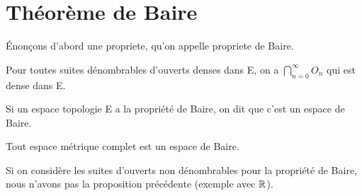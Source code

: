 \section{Théorème de Baire}

Énonçons d'abord une propriete, qu'on appelle propriete de Baire.

\begin{propriete} 
	Pour toutes suites dénombrables d'ouverts denses dans E, on a $\displaystyle
	\bigcap_{n = 0}^{\infty} O_{n}$ qui est dense dans E.
\end{propriete}



\begin{definition} 
	Si un espace topologie E a la propriété de Baire, on dit que c'est un espace
	de Baire.
\end{definition}

\begin{proposition}
	Tout espace métrique complet est un espace de Baire.
\end{proposition}

\begin{remarque}
	Si on considère les suites d'ouverts non dénombrables pour la propriété de
	Baire, nous n'avons pas la proposition précédente (exemple avec $\mathbb{R}$).
\end{remarque}
